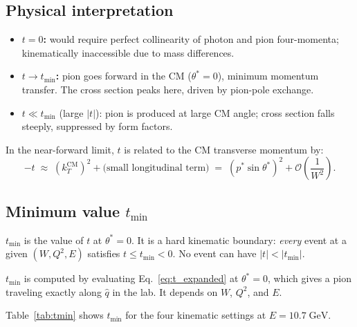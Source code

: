 \documentclass[12pt,a4paper]{article}
\begin{document}
\subsection{Physical interpretation}

\begin{itemize}[leftmargin=2em]
  \item \textbf{$t = 0$:} would require perfect collinearity of photon and
    pion four-momenta; kinematically inaccessible due to mass differences.
  \item \textbf{$t \to t_\text{min}$:} pion goes forward in the CM
    ($\theta^* = 0$), minimum momentum transfer. The cross section peaks here,
    driven by pion-pole exchange.
  \item \textbf{$t \ll t_\text{min}$} (large $|t|$): pion is produced at
    large CM angle; cross section falls steeply, suppressed by form factors.
\end{itemize}

In the near-forward limit, $t$ is related to the CM transverse momentum by:
\begin{equation}
  -t \;\approx\; (k_T^\text{CM})^2 + \text{(small longitudinal term)}
     \;=\; (p^* \sin\theta^*)^2 + \mathcal{O}\!\left(\frac{1}{W^2}\right).
  \label{eq:t_approx}
\end{equation}

\subsection{Minimum value \texorpdfstring{$t_\text{min}$}{tmin}}

$t_\text{min}$ is the value of $t$ at $\theta^* = 0$. It is a hard
kinematic boundary: \emph{every} event at a given $(W, Q^2, E)$ satisfies
$t \leq t_\text{min} < 0$. No event can have $|t| < |t_\text{min}|$.

\begin{importantbox}
$t_\text{min}$ is computed by evaluating Eq.~\eqref{eq:t_expanded} at
$\theta^* = 0$, which gives a pion traveling exactly along $\hat{q}$ in the
lab. It depends on $W$, $Q^2$, and $E$.
\end{importantbox}

Table~\ref{tab:tmin} shows $t_\text{min}$ for the four kinematic settings
at $E = 10.7\;\text{GeV}$.
\end{document}
